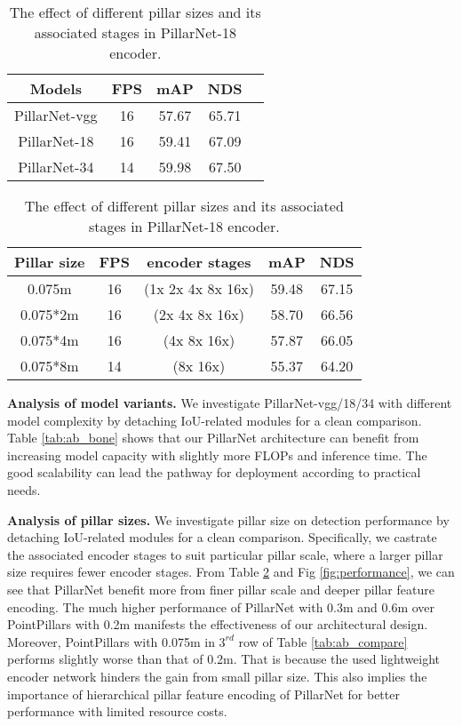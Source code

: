 \documentclass[runningheads]{llncs}
\begin{document}
\setlength{\tabcolsep}{1.4pt}
\begin{table}[t]
\parbox{0.38\linewidth}{
\centering
\caption{The effect of different PillarNet variants by detaching two IoU-related modules.}
\label{tab:ab_bone}
\begin{tabular}{c|c|c|cc}
\hline
Models & FPS & mAP & NDS \\ \hline
PillarNet-vgg & 16 & 57.67 & 65.71 \\
PillarNet-18 & 16 & 59.41 & 67.09 \\
PillarNet-34 & 14 & 59.98 & 67.50 \\
\hline
\end{tabular}
}
\hfill
\parbox{0.6\linewidth}{
\centering
\caption{The effect of different pillar sizes and its associated stages in PillarNet-18 encoder.}
\label{tab:ab_pillar}
\begin{tabular}{c|c|c|cc}
\hline
Pillar size & FPS & encoder stages & mAP & NDS  \\ \hline
0.075m & 16 & (1x 2x 4x 8x 16x) & 59.48 & 67.15 \\
0.075*2m & 16 & (2x 4x 8x 16x) & 58.70 & 66.56 \\
0.075*4m & 16 &(4x 8x 16x) & 57.87 & 66.05 \\
0.075*8m & 14 & (8x 16x) & 55.37 & 64.20 \\
\hline
\end{tabular}
}
\end{table}


{\flushleft \bf Analysis of model variants.}
We investigate PillarNet-vgg/18/34 with different model complexity by detaching IoU-related modules for a clean comparison.
Table \ref{tab:ab_bone} shows that our PillarNet architecture can benefit from increasing model capacity with slightly more FLOPs and inference time. 
The good scalability can lead the pathway for deployment according to practical needs.

{\flushleft \bf Analysis of pillar sizes.}
We investigate pillar size on detection performance by detaching IoU-related modules for a clean comparison.
Specifically, we castrate the associated encoder stages to suit particular pillar scale, where a larger pillar size requires fewer encoder stages.
From Table \ref{tab:ab_pillar} and Fig \ref{fig:performance}, we can see that PillarNet 
 benefit more from finer pillar scale and deeper pillar feature encoding.
The much higher performance of PillarNet with 0.3m and 0.6m over PointPillars with 0.2m manifests the effectiveness of our architectural design. 
Moreover, PointPillars \cite{lang2019pointpillars} with 0.075m in $3^{rd}$ row of Table \ref{tab:ab_compare} performs slightly worse than that of 0.2m. That is because the used lightweight encoder network hinders the gain from small pillar size. This also implies the importance of hierarchical pillar feature encoding of PillarNet for better performance with limited resource costs.
\end{document}
